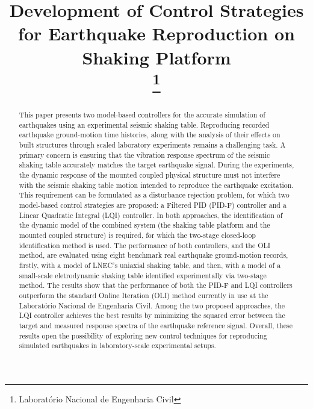 \documentclass[conference]{IEEEtran}
\begin{document}
\title{Development of Control Strategies for Earthquake Reproduction on Shaking Platform\\
\thanks{Laboratório Nacional de Engenharia Civil}
}

\author{
}
\maketitle

\begin{abstract}
This paper presents two model-based controllers for the accurate simulation of earthquakes using an experimental seismic shaking table. Reproducing recorded earthquake ground-motion time histories, along with the analysis of their effects on built structures through scaled laboratory experiments remains a challenging task. A primary concern is ensuring that the vibration response spectrum of the seismic shaking table accurately matches the target earthquake signal. During the experiments, the dynamic response of the mounted coupled physical structure must not interfere with the seismic shaking table motion intended to reproduce the earthquake excitation. This requirement can be formulated as a disturbance rejection problem, for which two model-based control strategies are proposed: a Filtered PID (PID-F) controller and a Linear Quadratic Integral (LQI) controller. In both approaches, the identification of the dynamic model of the combined system (the shaking table platform and the mounted coupled structure) is required, for which the two-stage closed-loop identification method is used. The performance of both controllers, and the OLI method, are evaluated using eight benchmark real earthquake ground-motion records, firstly, with a model of LNEC's uniaxial shaking table, and then, with a model of a small-scale eletrodynamic shaking table  identified experimentally via two-stage method. The results show that the performance of both the PID-F and LQI controllers outperform the standard Online Iteration (OLI) method currently in use at the Laboratório Nacional de Engenharia Civil. Among the two proposed approaches, the LQI controller achieves the best results by minimizing the squared error between the target and measured response spectra of the earthquake reference signal. Overall, these results open the possibility of exploring new control techniques for reproducing simulated earthquakes in laboratory-scale experimental setups.
\end{abstract}
\end{document}
